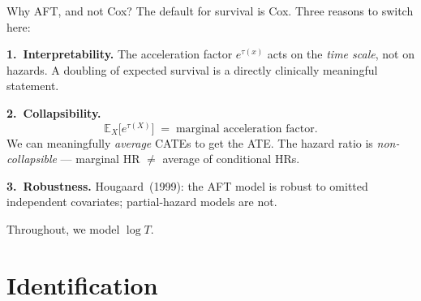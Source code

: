 \documentclass[10pt,aspectratio=169]{beamer}
\newcommand{\E}{\mathbb{E}}
\begin{document}
\begin{frame}{Why AFT, and not Cox?}
The default for survival is Cox. Three reasons to switch here:

\medskip

\textbf{1.~Interpretability.} The acceleration factor $e^{\tau(x)}$ acts on the \emph{time scale}, not on hazards. A doubling of expected survival is a directly clinically meaningful statement.

\medskip

\textbf{2.~Collapsibility.}
\[
\E_X\!\bigl[e^{\tau(X)}\bigr] \;=\; \text{marginal acceleration factor.}
\]
We can meaningfully \emph{average} CATEs to get the ATE. The hazard ratio is \emph{non-collapsible} — marginal HR $\neq$ average of conditional HRs.

\medskip

\textbf{3.~Robustness.} Hougaard~(1999): the AFT model is robust to omitted independent covariates; partial-hazard models are not.

\medskip

\alert{Throughout, we model $\log T$.}
\end{frame}

\section{Identification}
\end{document}
